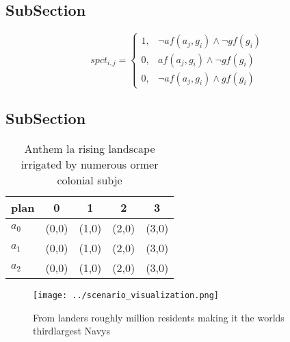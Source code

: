 \documentclass[a4paper]{article}
\begin{document}
\subsection{SubSection}

\begin{equation}
spct_{i,j} =
\begin{cases}
1, & \text{$\neg af(a_j,g_i) \wedge \neg gf(g_i)$}\\
0, & \text{$af(a_j,g_i) \wedge \neg gf(g_i)$}\\
0, & \text{$\neg af(a_j,g_i) \wedge gf(g_i)$}
\end{cases}
\end{equation}

\subsection{SubSection}

\begin{table}
\begin{adjustbox}{width=0.6\columnwidth}
\begin{tabular}{|l|l|l|l|l|}
\hline
\textbf{plan} & \multicolumn{1}{c|}{\textbf{0}} & \multicolumn{1}{c|}{\textbf{1}} & \multicolumn{1}{c|}{\textbf{2}} & \multicolumn{1}{c|}{\textbf{3}} \\ \hline
\textbf{$a_0$}  & (0,0) & (1,0) & (2,0) & (3,0) \\ \hline
\textbf{$a_1$}  & (0,0) & (1,0) & (2,0) & (3,0) \\ \hline
\textbf{$a_2$}  & (0,0) & (1,0) & (2,0) & (3,0) \\ \hline
\end{tabular}
\end{adjustbox}
\caption{Anthem la rising landscape irrigated by numerous ormer colonial subje
}
\end{table}

\begin{figure}
\centering
\texttt{[image: ../scenario\_visualization.png]}
\caption{From landers roughly million residents making it the worlds thirdlargest Navys 
}
\end{figure}
 
\end{document}
